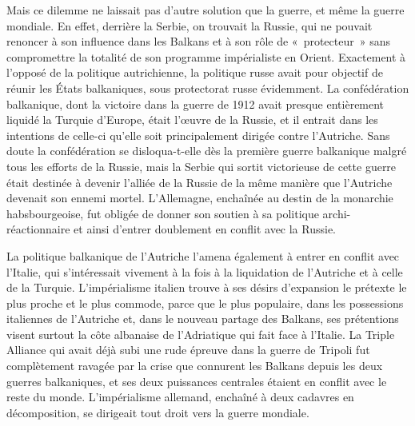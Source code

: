 \documentclass[french,twoside]{book} %
\begin{document}
Mais ce dilemme ne laissait pas d’autre solution que la guerre, et même la guerre mondiale. En effet, derrière la Serbie, on trouvait la Russie, qui ne pouvait renoncer à son influence dans les Balkans et à son rôle de « protecteur » sans compromettre la totalité de son programme impérialiste en Orient. Exactement à l’opposé de la politique autrichienne, la politique russe avait pour objectif de réunir les États balkaniques, sous protectorat russe évidemment. La confédération balkanique, dont la victoire dans la guerre de 1912 avait presque entièrement liquidé la Turquie d’Europe, était l’œuvre de la Russie, et il entrait dans les intentions de celle-ci qu’elle soit principalement dirigée contre l’Autriche. Sans doute la confédération se disloqua-t-elle dès la première guerre balkanique malgré tous les efforts de la Russie, mais la Serbie qui sortit victorieuse de cette guerre était destinée à devenir l’alliée de la Russie de la même manière que l’Autriche devenait son ennemi mortel. L'Allemagne, enchaînée au destin de la monarchie habsbourgeoise, fut obligée de donner son soutien à sa politique archi-réactionnaire et ainsi d’entrer doublement en conflit avec la Russie.\par
La politique balkanique de l’Autriche l’amena également à entrer en conflit avec l’Italie, qui s’intéressait vivement à la fois à la liquidation de l’Autriche et à celle de la Turquie. L'impérialisme italien trouve à ses désirs d’expansion le prétexte le plus proche et le plus commode, parce que le plus populaire, dans les possessions italiennes de l’Autriche et, dans le nouveau partage des Balkans, ses prétentions visent surtout la côte albanaise de l’Adriatique qui fait face à l’Italie. La Triple Alliance qui avait déjà subi une rude épreuve dans la guerre de Tripoli fut complètement ravagée par la crise que connurent les Balkans depuis les deux guerres balkaniques, et ses deux puissances centrales étaient en conflit avec le reste du monde. L'impérialisme allemand, enchaîné à deux cadavres en décomposition, se dirigeait tout droit vers la guerre mondiale.\par
\end{document}
